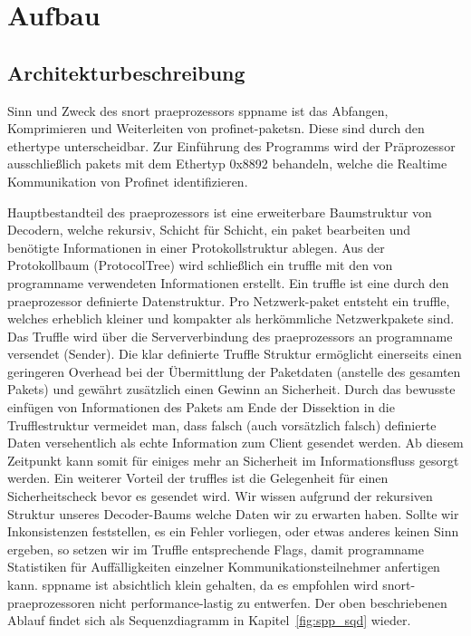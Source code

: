 \chapter{Aufbau \sppname}

\section{Architekturbeschreibung}

Sinn und Zweck des \gls{snort} \gls{praeprozessor}s \gls{sppname} ist das Abfangen,
Komprimieren und Weiterleiten von \gls{profinet}-\glspl{paket}n. Diese
sind durch den \gls{ethertype} unterscheidbar. Zur Einführung des Programms wird der Präprozessor ausschließlich \glspl{paket} mit dem Ethertyp 0x8892 behandeln, welche die Realtime Kommunikation von Profinet identifizieren.

Hauptbestandteil des \gls{praeprozessor}s ist eine erweiterbare Baumstruktur von Decodern, welche rekursiv, Schicht für Schicht, ein \gls{paket} bearbeiten und benötigte Informationen in einer Protokollstruktur ablegen. Aus der Protokollbaum (ProtocolTree) wird schließlich ein \gls{truffle} mit den von \gls{programname} verwendeten Informationen erstellt. Ein \gls{truffle} ist eine durch den \gls{praeprozessor} definierte Datenstruktur.
Pro Netzwerk-\gls{paket} entsteht ein \gls{truffle}, welches erheblich kleiner und kompakter als herkömmliche Netzwerkpakete sind. Das Truffle wird über die Serververbindung des {praeprozessor}s
an \gls{programname} versendet (Sender). Die klar definierte Truffle Struktur ermöglicht einerseits einen geringeren Overhead bei der Übermittlung der Paketdaten (anstelle des gesamten Pakets) und gewährt zusätzlich einen Gewinn an Sicherheit. Durch das bewusste einfügen von Informationen des Pakets am Ende der Dissektion in die Trufflestruktur vermeidet man, dass falsch (auch vorsätzlich falsch) definierte Daten versehentlich als echte Information zum Client gesendet werden. Ab diesem Zeitpunkt kann somit für einiges mehr an Sicherheit im Informationsfluss gesorgt werden.
Ein weiterer Vorteil der \glspl{truffle} ist die Gelegenheit für einen Sicherheitscheck bevor es gesendet wird. Wir wissen aufgrund der rekursiven Struktur unseres Decoder-Baums welche Daten wir zu erwarten haben. Sollte wir Inkonsistenzen feststellen, es ein Fehler vorliegen, oder etwas anderes keinen Sinn ergeben, so setzen wir im Truffle entsprechende Flags, damit \gls{programname} Statistiken für Auffälligkeiten einzelner Kommunikationsteilnehmer anfertigen kann.\newline
\gls{sppname} ist absichtlich klein gehalten, da es empfohlen wird \gls{snort}-\gls{praeprozessor}en nicht performance-lastig zu entwerfen. Der oben beschriebenen Ablauf findet sich als Sequenzdiagramm in Kapitel~\ref{fig:spp_sqd} wieder.


